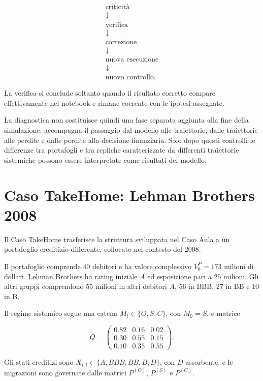 \begin{gather*}
\text{criticit\`a}\\
\downarrow\\
\text{verifica}\\
\downarrow\\
\text{correzione}\\
\downarrow\\
\text{nuova esecuzione}\\
\downarrow\\
\text{nuovo controllo}.
\end{gather*}

La verifica si conclude soltanto quando il risultato corretto compare
effettivamente nel notebook e rimane coerente con le ipotesi assegnate.

La diagnostica non costituisce quindi una fase separata aggiunta alla fine
della simulazione: accompagna il passaggio dal modello alle traiettorie,
dalle traiettorie alle perdite e dalle perdite alla decisione finanziaria.
Solo dopo questi controlli le differenze tra portafogli e tra repliche
caratterizzate da differenti traiettorie sistemiche possono essere
interpretate come risultati del modello.
%


\section{Caso TakeHome: Lehman Brothers 2008}

Il Caso TakeHome trasferisce la struttura sviluppata nel Caso Aula a un
portafoglio creditizio differente, collocato nel contesto del 2008.

Il portafoglio comprende $40$ debitori e ha valore complessivo
$V_0^P=173$ milioni di dollari. Lehman Brothers ha rating iniziale $A$ ed
esposizione pari a $25$ milioni. Gli altri gruppi comprendono $55$ milioni
in altri debitori $A$, $56$ in BBB, $27$ in BB e $10$ in B.

Il regime sistemico segue una catena
$M_t\in\{O,S,C\}$, con $M_0=S$, e matrice

\[
Q=
\begin{pmatrix}
0.82 & 0.16 & 0.02
\\
0.30 & 0.55 & 0.15
\\
0.10 & 0.35 & 0.55
\end{pmatrix}.
\]

Gli stati creditizi sono
$X_{i,t}\in\{A,BBB,BB,B,D\}$, con $D$ assorbente, e le migrazioni sono
governate dalle matrici $P^{(O)}$, $P^{(S)}$ e $P^{(C)}$.

